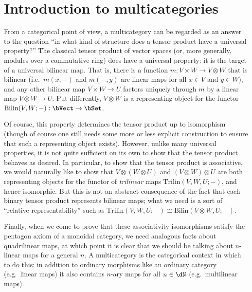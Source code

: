 \documentclass{book}
\let\tensor\otimes
\begin{document}
\section{Introduction to multicategories}
\label{sec:multicats-catth}

From a categorical point of view, a multicategory can be regarded as an answer to the question ``in what kind of structure does a tensor product have a universal property?''
The classical tensor product of vector spaces (or, more generally, modules over a commutative ring) does have a universal property: it is the target of a universal bilinear map.
That is, there is a function $m:V\times W \to V\tensor W$ that is bilinear (i.e.\ $m(x,-)$ and $m(-,y)$ are linear maps for all $x\in V$ and $y\in W$), and any other bilinear map $V\times W \to U$ factors uniquely through $m$ by a linear map $V\tensor W \to U$.
Put differently, $V\tensor W$ is a representing object for the functor $\mathrm{Bilin}(V,W;-) : \bVect \to \bSet$.

Of course, this property determines the tensor product up to isomorphism (though of course one still needs some more or less explicit construction to ensure that such a representing object exists).
However, unlike many universal properties, it is not quite sufficient on its own to show that the tensor product behaves as desired.
In particular, to show that the tensor product is associative, we would naturally like to show that $V\tensor (W\tensor U)$ and $(V\tensor W)\tensor U$ are both representing objects for the functor of \emph{trilinear} maps $\mathrm{Trilin}(V,W,U;-)$, and hence isomorphic.
But this is not an abstract consequence of the fact that each binary tensor product represents bilinear maps;
what we need is a sort of ``relative representability'' such as $\mathrm{Trilin}(V,W,U;-) \cong \mathrm{Bilin}(V\tensor W,U;-)$.

Finally, when we come to prove that these associativity isomorphisms satisfy the pentagon axiom of a monoidal category, we need analogous facts about quadrilinear maps, at which point it is clear that we should be talking about $n$-linear maps for a general $n$.
A multicategory is the categorical context in which to do this: in addition to ordinary morphisms like an ordinary category (e.g.\ linear maps) it also contains $n$-ary maps for all $n\in\dN$ (e.g.\ multilinear maps).

\end{document}
